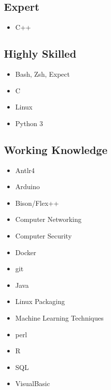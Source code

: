\documentclass[10pt,a4paper,sans]{moderncv}        %
\begin{document}
\subsection{Expert}

\begin{multicols}{3}
\begin{itemize}

\item C++

\end{itemize}
\end{multicols}

\subsection{Highly Skilled}

\begin{multicols}{3}
\begin{itemize}

\item Bash, Zsh, Expect
\item C
\item Linux
\item Python 3

\end{itemize}
\end{multicols}

\subsection{Working Knowledge}

\begin{multicols}{3}
\begin{itemize}

\item Antlr4 
\item Arduino
\item Bison/Flex++
\item Computer Networking
\item Computer Security
\item Docker
\item git
\item Java
\item Linux Packaging
\item Machine Learning Techniques
\item perl
\item R
\item SQL
\item VisualBasic

\end{itemize}
\end{multicols}
\end{document}
